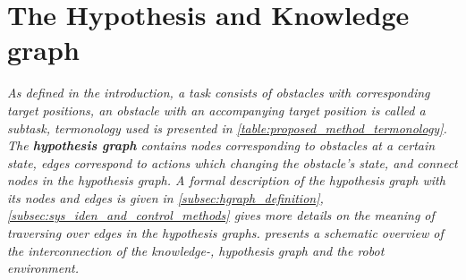\chapter{The Hypothesis and Knowledge graph}
\textit{
  As defined in the introduction, a task consists of obstacles with corresponding target positions, an obstacle with an accompanying target position is called a subtask, termonology used is presented in \cref{table:proposed_method_termonology}. The \textbf{hypothesis graph} contains nodes corresponding to obstacles at a certain state, edges correspond to actions which changing the obstacle's state, and connect nodes in the hypothesis graph. A formal description of the hypothesis graph with its nodes and edges is given in \cref{subsec:hgraph_definition}, \cref{subsec:sys_iden_and_control_methods} gives more details on the meaning of traversing over edges in the hypothesis graphs.  presents a schematic overview of the interconnection of the knowledge-, hypothesis graph and the robot environment.\bs
}

